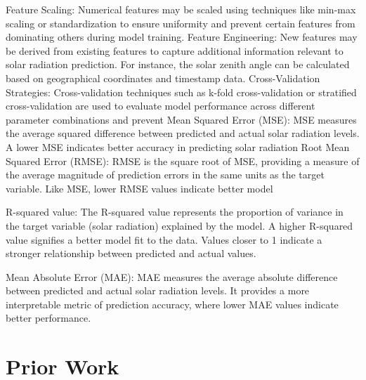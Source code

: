 \documentclass[10pt,twocolumn]{article}
\begin{document}
Feature Scaling: Numerical features may be scaled using techniques like min-max scaling or standardization to ensure uniformity and prevent certain features from dominating others during model training.
Feature Engineering: New features may be derived from existing features to capture additional information relevant to solar radiation prediction. For instance, the solar zenith angle can be calculated based on geographical coordinates and\vspace{1em} %
timestamp 
data.
Cross-Validation Strategies: Cross-validation techniques such as k-fold cross-validation or stratified cross-validation are used to evaluate model performance across different parameter combinations and prevent\vspace{1em} %
Mean Squared Error (MSE):
MSE measures the average squared difference between predicted and actual solar radiation levels.
A lower MSE indicates better accuracy in predicting solar radiation \vspace{1em} %
Root Mean Squared Error (RMSE):
RMSE is the square root of MSE, providing a measure of the average magnitude of prediction errors in the same units as the target variable.
Like MSE, lower RMSE values indicate better model \vspace{1em} %

R-squared value:
The R-squared value represents the proportion of variance in the target variable (solar radiation) explained by the model.
A higher R-squared value signifies a better model fit to the data.  Values closer to 1 indicate a stronger relationship between predicted and actual
\vspace{em} %
values.

Mean Absolute Error (MAE):
MAE measures the average absolute difference between predicted and actual solar radiation levels.
It provides a more interpretable metric of prediction accuracy, where lower MAE values indicate better performance.



\section{Prior Work}
\end{document}
